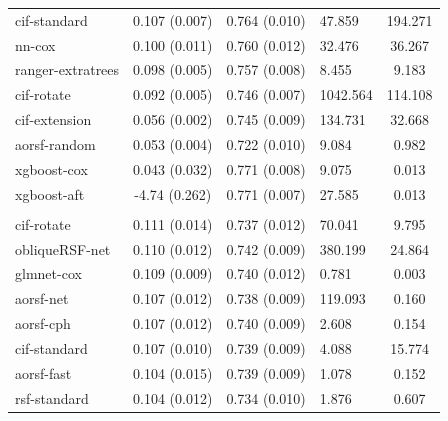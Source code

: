 \documentclass[twoside,11pt]{article}\usepackage[]{graphicx}\usepackage[]{xcolor}
\newenvironment{knitrout}{}{} %
\begin{document}
\begin{knitrout}
\begin{longtable}[t]{lcclc}
\hspace{1em}cif-standard & 0.107 (0.007) & 0.764 (0.010) & 47.859 & 194.271\\
\hspace{1em}nn-cox & 0.100 (0.011) & 0.760 (0.012) & 32.476 & 36.267\\
\hspace{1em}ranger-extratrees & 0.098 (0.005) & 0.757 (0.008) & 8.455 & 9.183\\
\hspace{1em}cif-rotate & 0.092 (0.005) & 0.746 (0.007) & 1042.564 & 114.108\\
\hspace{1em}cif-extension & 0.056 (0.002) & 0.745 (0.009) & 134.731 & 32.668\\
\hspace{1em}aorsf-random & 0.053 (0.004) & 0.722 (0.010) & 9.084 & 0.982\\
\hspace{1em}xgboost-cox & 0.043 (0.032) & 0.771 (0.008) & 9.075 & 0.013\\
\hspace{1em}xgboost-aft & -4.74 (0.262) & 0.771 (0.007) & 27.585 & 0.013\\
\addlinespace[0.3em]
\hline
\multicolumn{5}{l}{\textit{\textbf{Systolic Heart Failure; death, n = 2231, p = 41}}}\\
\hline
\hspace{1em}cif-rotate & 0.111 (0.014) & 0.737 (0.012) & 70.041 & 9.795\\
\hspace{1em}obliqueRSF-net & 0.110 (0.012) & 0.742 (0.009) & 380.199 & 24.864\\
\hspace{1em}glmnet-cox & 0.109 (0.009) & 0.740 (0.012) & 0.781 & 0.003\\
\hspace{1em}aorsf-net & 0.107 (0.012) & 0.738 (0.009) & 119.093 & 0.160\\
\hspace{1em}aorsf-cph & 0.107 (0.012) & 0.740 (0.009) & 2.608 & 0.154\\
\hspace{1em}cif-standard & 0.107 (0.010) & 0.739 (0.009) & 4.088 & 15.774\\
\hspace{1em}aorsf-fast & 0.104 (0.015) & 0.739 (0.009) & 1.078 & 0.152\\
\hspace{1em}rsf-standard & 0.104 (0.012) & 0.734 (0.010) & 1.876 & 0.607\\

\end{longtable}
\end{knitrout}
\end{document}
